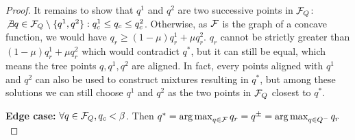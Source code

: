 \begin{proof}
It remains to show that $q^1$ and $q^2$ are two successive points in $\mathcal{F}_Q$: $\not\exists q\in\mathcal{F}_Q\setminus\{q^1, q^2\}: q^1_c \leq q_c \leq q^2_c$. Otherwise, as $\mathcal{F}$ is the graph of a concave function, we would have $q_r \geq (1-\mu)q_r^1 + \mu q_r^2$. $q_r$ cannot be strictly greater than $(1-\mu)q_r^1 + \mu q_r^2$ which would contradict $q^*$, but it can still be equal, which means the tree points $q, q^1, q^2$ are aligned. In fact, every points aligned with $q^1$ and $q^2$ can also be used to construct mixtures resulting in $q^*$, but among these solutions we can still choose $q^1$ and $q^2$ as the two points in $\mathcal{F}_Q$ closest to $q^*$.

\textbf{Edge case:} $\forall q\in\mathcal{F}_Q, q_c < \beta$. Then  $q^* =  \operatorname*{arg\,max}_{q\in\mathcal{F}} q_r = q^\pm =  \operatorname*{arg\,max}_{q\in Q^-} q_r$

\end{proof}







